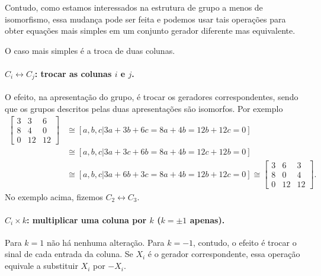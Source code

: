     	\par\vspace{0.3cm} Contudo, como estamos interessados na estrutura de grupo a menos de isomorfismo, 
    	essa mudança pode ser feita e podemos usar tais operações para obter equações mais simples em um 
    	conjunto gerador diferente mas equivalente.
    	
    	\par\vspace{0.3cm} O caso mais simples é a troca de duas colunas. 
    	
    	\paragraph{$C_i\leftrightarrow C_j$: trocar as colunas $i$ e $j$.} O efeito, na apresentação do grupo, 
    	é trocar os geradores correspondentes, sendo que os grupos descritos pelas duas apresentações são
    	isomorfos. Por exemplo
    	\begin{align*}
        	\begin{bmatrix}
        	3 & 3 & 6 \\
        	8 & 4 & 0 \\
        	0 & 12 & 12
        	\end{bmatrix} 
        	&\cong [ a,b,c \vert 3a+3b+6c=8a+4b=12b+12c=0 ] \\ 
        	&\cong [ a,b,c \vert 3a+3c+6b=8a+4b=12c+12b=0 ] \\ 
        	&\cong [ a,b,c \vert 3a+6b+3c=8a+4b=12b+12c=0 ] 
        	\cong 
        	\begin{bmatrix}
        	3 & 6 & 3 \\
        	8 & 0 & 4 \\
        	0 & 12 & 12
        	\end{bmatrix}.
    	\end{align*}
    	No exemplo acima, fizemos $C_2\leftrightarrow C_3$.
    	
    	\paragraph{$C_i\times k$: multiplicar uma coluna por $k$ ($k=\pm1$ apenas).} Para $k=1$ não há nenhuma
    	alteração. Para $k=-1$, contudo, o efeito é trocar o sinal de cada entrada da coluna. Se $X_i$ é o 
    	gerador correspondente, essa operação equivale a substituir $X_i$ por $-X_i$.
    	
